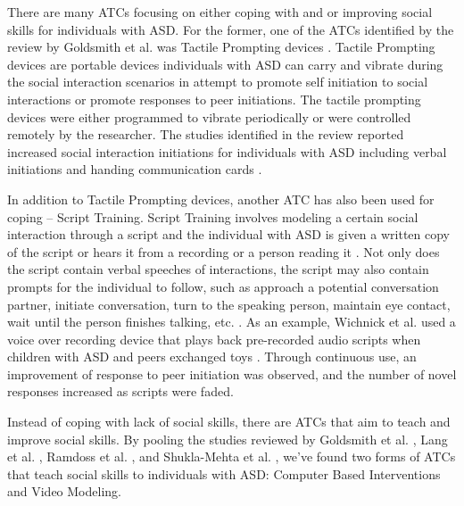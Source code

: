 \documentclass{ut-thesis}
\begin{document}
There are many ATCs focusing on either coping with and or improving social skills for individuals with ASD.  For the former, one of the ATCs identified by the review by Goldsmith et al. was Tactile Prompting devices \cite{goldsmith2004use}.  Tactile Prompting devices are portable devices individuals with ASD can carry and vibrate during the social interaction scenarios in attempt to promote self initiation to social interactions or promote responses to peer initiations.  The tactile prompting devices were either programmed to vibrate periodically or were controlled remotely by the researcher.  The studies identified in the review reported increased social interaction initiations for individuals with ASD including verbal initiations \cite{shabani2002increasing, taylor1998teaching} and handing communication cards \cite{taylor2004teaching}.

In addition to Tactile Prompting devices, another ATC has also been used for coping -- Script Training.  Script Training involves modeling a certain social interaction through a script and the individual with ASD is given a written copy of the script or hears it from a recording or a person reading it \cite{stevenson2000social}.  Not only does the script contain verbal speeches of interactions, the script may also contain prompts for the individual to follow, such as approach a potential conversation partner, initiate conversation, turn to the speaking person, maintain eye contact, wait until the person finishes talking, etc. \cite{wichnick2010effect}.  As an example, Wichnick et al. used a voice over recording device that plays back pre-recorded audio scripts when children with ASD and peers exchanged toys \cite{wichnick2010effect}.  Through continuous use, an improvement of response to peer initiation was observed, and the number of novel responses increased as scripts were faded.

Instead of coping with lack of social skills, there are ATCs that aim to teach and improve social skills.  By pooling the studies reviewed by Goldsmith et al. \cite{goldsmith2004use}, Lang et al. \cite{lang2014assistive}, Ramdoss et al. \cite{ramdoss2012computer}, and  Shukla-Mehta et al. \cite{shukla2009evaluating}, we've found two forms of ATCs that teach social skills to individuals with ASD: Computer Based Interventions and Video Modeling.
\end{document}
